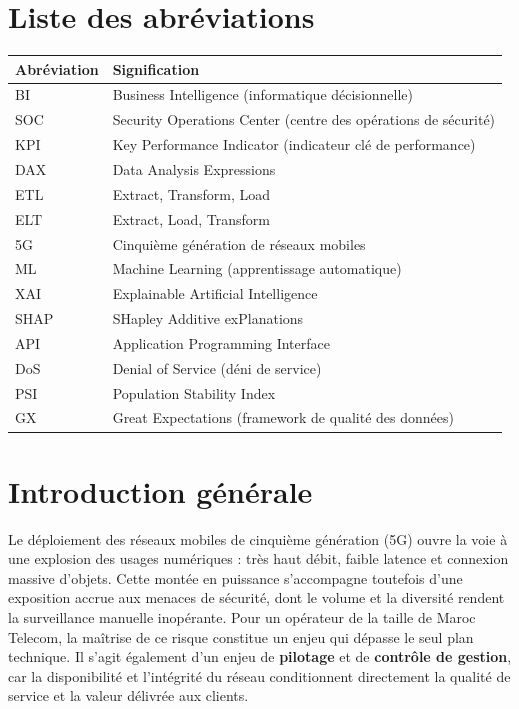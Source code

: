 \documentclass[12pt,a4paper,oneside]{report}
\begin{document}
\chapter*{Liste des abréviations}
\begin{tabularx}{\textwidth}{lX}
\toprule
\textbf{Abréviation} & \textbf{Signification} \\
\midrule
BI    & Business Intelligence (informatique décisionnelle) \\
SOC   & Security Operations Center (centre des opérations de sécurité) \\
KPI   & Key Performance Indicator (indicateur clé de performance) \\
DAX   & Data Analysis Expressions \\
ETL   & Extract, Transform, Load \\
ELT   & Extract, Load, Transform \\
5G    & Cinquième génération de réseaux mobiles \\
ML    & Machine Learning (apprentissage automatique) \\
XAI   & Explainable Artificial Intelligence \\
SHAP  & SHapley Additive exPlanations \\
API   & Application Programming Interface \\
DoS   & Denial of Service (déni de service) \\
PSI   & Population Stability Index \\
GX    & Great Expectations (framework de qualité des données) \\
\bottomrule
\end{tabularx}

\cleardoublepage
{}

\chapter*{Introduction générale}

Le déploiement des réseaux mobiles de cinquième génération (5G) ouvre la voie à une explosion des usages numériques : très haut débit, faible latence et connexion massive d'objets. Cette montée en puissance s'accompagne toutefois d'une exposition accrue aux menaces de sécurité, dont le volume et la diversité rendent la surveillance manuelle inopérante. Pour un opérateur de la taille de Maroc Telecom, la maîtrise de ce risque constitue un enjeu qui dépasse le seul plan technique. Il s'agit également d'un enjeu de \textbf{pilotage} et de \textbf{contrôle de gestion}, car la disponibilité et l'intégrité du réseau conditionnent directement la qualité de service et la valeur délivrée aux clients.
\end{document}
